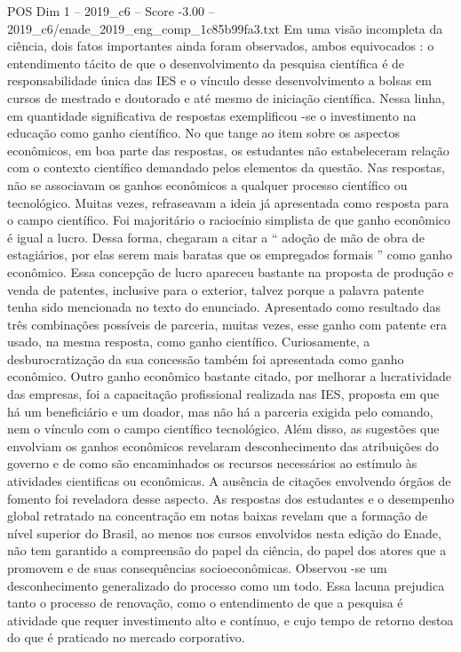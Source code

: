 \begin{textsample}{POS Dim 1 – 2019\_c6 – Score -3.00 – 2019\_c6/enade\_2019\_eng\_comp\_1c85b99fa3.txt}
Em uma visão incompleta da ciência, dois fatos importantes ainda foram observados, ambos equivocados : o entendimento tácito de que o desenvolvimento da pesquisa científica é de responsabilidade única das IES e o vínculo desse desenvolvimento a bolsas em cursos de mestrado e doutorado e até mesmo de iniciação científica.
Nessa linha, em quantidade significativa de respostas exemplificou -se o investimento na educação como ganho científico.
No que tange ao item sobre os aspectos econômicos, em boa parte das respostas, os estudantes não estabeleceram relação com o contexto científico demandado pelos elementos da questão.
Nas respostas, não se associavam os ganhos econômicos a qualquer processo científico ou tecnológico.
Muitas vezes, refraseavam a ideia já apresentada como resposta para o campo científico.
Foi majoritário o raciocínio simplista de que ganho econômico é igual a lucro.
Dessa forma, chegaram a citar a “ adoção de mão de obra de estagiários, por elas serem mais baratas que os empregados formais ” como ganho econômico.
Essa concepção de lucro apareceu bastante na proposta de produção e venda de patentes, inclusive para o exterior, talvez porque a palavra patente tenha sido mencionada no texto do enunciado.
Apresentado como resultado das três combinações possíveis de parceria, muitas vezes, esse ganho com patente era usado, na mesma resposta, como ganho científico.
Curiosamente, a desburocratização da sua concessão também foi apresentada como ganho econômico.
Outro ganho econômico bastante citado, por melhorar a lucratividade das empresas, foi a capacitação profissional realizada nas IES, proposta em que há um beneficiário e um doador, mas não há a parceria exigida pelo comando, nem o vínculo com o campo científico tecnológico.
Além disso, as sugestões que envolviam os ganhos econômicos revelaram desconhecimento das atribuições do governo e de como são encaminhados os recursos necessários ao estímulo às atividades cientificas ou econômicas.
A ausência de citações envolvendo órgãos de fomento foi reveladora desse aspecto.
As respostas dos estudantes e o desempenho global retratado na concentração em notas baixas revelam que a formação de nível superior do Brasil, ao menos nos cursos envolvidos nesta edição do Enade, não tem garantido a compreensão do papel da ciência, do papel dos atores que a promovem e de suas consequências socioeconômicas.
Observou -se um desconhecimento generalizado do processo como um todo.
Essa lacuna prejudica tanto o processo de renovação, como o entendimento de que a pesquisa é atividade que requer investimento alto e contínuo, e cujo tempo de retorno destoa do que é praticado no mercado corporativo.

\end{textsample}
